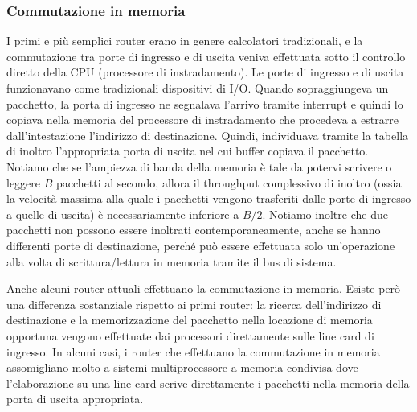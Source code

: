 \subsubsection{Commutazione in memoria}
I primi e più semplici router erano in genere calcolatori tradizionali, e la commutazione tra porte di ingresso e di uscita veniva effettuata sotto il controllo diretto della CPU (processore di instradamento). Le porte di ingresso e di uscita funzionavano come tradizionali dispositivi di I/O. Quando sopraggiungeva un pacchetto, la porta di ingresso ne segnalava l'arrivo tramite interrupt e quindi lo copiava nella memoria del processore di instradamento che procedeva a estrarre dall'intestazione l'indirizzo di destinazione. Quindi, individuava tramite la tabella di inoltro l'appropriata porta di uscita nel cui buffer copiava il pacchetto. Notiamo che se l'ampiezza di banda della memoria è tale da potervi scrivere o leggere $B$ pacchetti al secondo, allora il throughput complessivo di inoltro (ossia la velocità massima alla quale i pacchetti vengono trasferiti dalle porte di ingresso a quelle di uscita) è necessariamente inferiore a $B/2$. Notiamo inoltre che due pacchetti non possono essere inoltrati contemporaneamente, anche se hanno differenti porte di destinazione, perché può essere effettuata solo un'operazione alla volta di scrittura/lettura in memoria tramite il bus di sistema.

Anche alcuni router attuali effettuano la commutazione in memoria. Esiste però una differenza sostanziale rispetto ai primi router: la ricerca dell'indirizzo di destinazione e la memorizzazione del pacchetto nella locazione di memoria opportuna vengono effettuate dai processori direttamente sulle line card di ingresso. In alcuni casi, i router che effettuano la commutazione in memoria assomigliano molto a sistemi multiprocessore a memoria condivisa dove l'elaborazione su una line card scrive direttamente i pacchetti nella memoria della porta di uscita appropriata.

